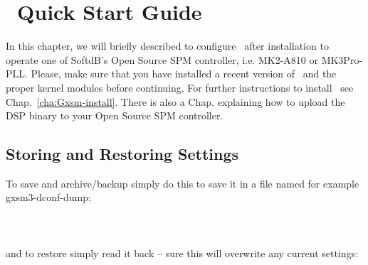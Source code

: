
\chapter{\Gxsm\ Quick Start Guide}
\label{cha:Gxsm-quick}
In this chapter, we will briefly described to configure \Gxsm\ after installation to operate one of SoftdB's Open Source SPM controller, i.e. MK2-A810 or MK3Pro-PLL. Please, make sure that you have installed a recent version of \Gxsm\ and the proper kernel modules before continuing. For further instructions to install \Gxsm\ see Chap.~\ref{cha:Gxsm-install}. There is also a Chap. explaining how to upload the DSP binary to your Open Source SPM controller.


\section{Storing and Restoring Settings}
\label{sec:Gxsm-quick-StoringSettings}
To save and archive/backup simply do this to save it in a file named for example gxsm3-dconf-dump:\\ \\
\\ \\
and to restore simply read it back -- sure this will overwrite any current settings:\\\\
\\

